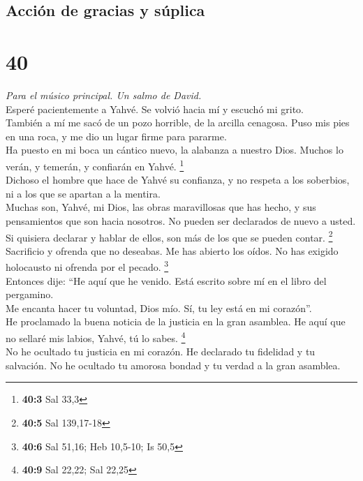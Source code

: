 \hypertarget{acciuxf3n-de-gracias-y-suxfaplica}{%
\subsection{Acción de gracias y
súplica}\label{acciuxf3n-de-gracias-y-suxfaplica}}

\hypertarget{section-38}{%
\section{40}\label{section-38}}

\emph{Para el músico principal. Un salmo de David.}\\
 Esperé pacientemente a Yahvé. Se volvió hacia mí y
escuchó mi grito.\\
 También a mí me sacó de un pozo horrible, de la arcilla
cenagosa. Puso mis pies en una roca, y me dio un lugar firme para
pararme.\\
 Ha puesto en mi boca un cántico nuevo, la alabanza a
nuestro Dios. Muchos lo verán, y temerán, y confiarán en Yahvé.
\footnote{\textbf{40:3} Sal 33,3}\\
 Dichoso el hombre que hace de Yahvé su confianza, y no
respeta a los soberbios, ni a los que se apartan a la mentira.\\
 Muchas son, Yahvé, mi Dios, las obras maravillosas que
has hecho, y sus pensamientos que son hacia nosotros. No pueden ser
declarados de nuevo a usted. Si quisiera declarar y hablar de ellos, son
más de los que se pueden contar. \footnote{\textbf{40:5} Sal 139,17-18}\\
 Sacrificio y ofrenda que no deseabas. Me has abierto los
oídos. No has exigido holocausto ni ofrenda por el pecado. \footnote{\textbf{40:6}
  Sal 51,16; Heb 10,5-10; Is 50,5}\\
 Entonces dije: ``He aquí que he venido. Está escrito
sobre mí en el libro del pergamino.\\
 Me encanta hacer tu voluntad, Dios mío. Sí, tu ley está
en mi corazón''.\\
 He proclamado la buena noticia de la justicia en la gran
asamblea. He aquí que no sellaré mis labios, Yahvé, tú lo sabes.
\footnote{\textbf{40:9} Sal 22,22; Sal 22,25}\\
 No he ocultado tu justicia en mi corazón. He declarado
tu fidelidad y tu salvación. No he ocultado tu amorosa bondad y tu
verdad a la gran asamblea.\\
